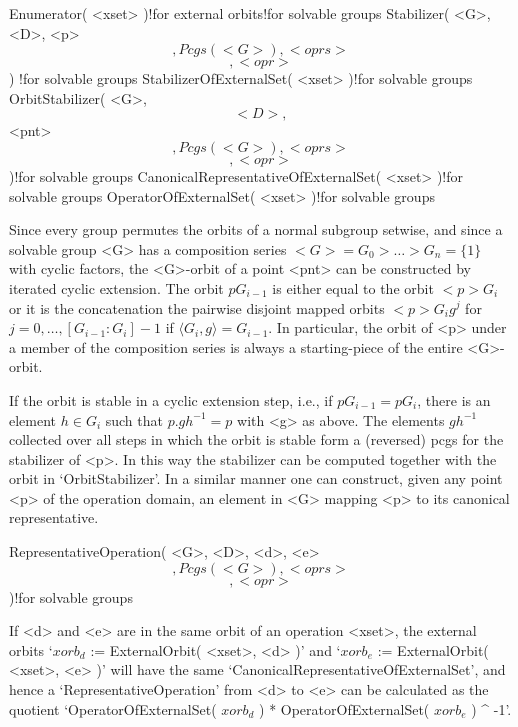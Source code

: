 \>Enumerator( <xset> )!{for external orbits!for solvable groups}
\>Stabilizer( <G>, <D>, <p> \[, {Pcgs( <G> )}, <oprs> \] \[, <opr> \] )%
  !{for solvable groups}
\>StabilizerOfExternalSet( <xset> )!{for solvable groups}
\>OrbitStabilizer( <G>, \[ <D>, \] <pnt> \[, {Pcgs( <G> )}, <oprs> \] %
                   \[, <opr> \] )!{for solvable groups}
\>CanonicalRepresentativeOfExternalSet( <xset> )!{for solvable groups}
\>OperatorOfExternalSet( <xset> )!{for solvable groups}

\danger    Since every group permutes   the  orbits of  a normal subgroup
setwise, and since  a solvable group <G> has  a composition series $<G> =
G_0 > \ldots  > G_n=\{1\}$ with cyclic  factors, the <G>-orbit of a point
<pnt> can  be  constructed by iterated  cyclic   extension. The  orbit $p
G_{i-1}$ is   either  equal  to the   orbit   $<p>  G_i$  or it    is the
concatenation  the pairwise   disjoint  mapped orbits   $<p>  G_ig^j$ for
$j=0,\ldots, [G_{i-1}:G_i] - 1$ if  $\langle G_i, g\rangle = G_{i-1}$. In
particular, the orbit of <p> under a  member of the composition series is
always a starting-piece of the entire <G>-orbit.

If the orbit is stable in a cyclic extension step,  i.e., if $p G_{i-1} =
p G_i$, there is an element $h\in G_i$ such that $p.gh^{-1} = p$ with <g>
as above. The  elements $gh^{-1}$ collected over  all steps  in which the
orbit is stable form a (reversed) pcgs for the stabilizer of <p>. In this
way the    stabilizer  can be   computed together    with   the orbit  in
`OrbitStabilizer'. In a similar manner one can construct, given any point
<p> of   the operation domain,  an   element in  <G> mapping <p>   to its
canonical representative.

\>RepresentativeOperation( <G>, <D>, <d>, <e> \[, {Pcgs( <G> )}, <oprs> %
                           \] \[, <opr> \] )!{for solvable groups}

If <d> and <e> are in the same orbit of an operation <xset>, the external
orbits `$xorb_d$    := ExternalOrbit( <xset>,  <d>   )'  and `$xorb_e$ :=
ExternalOrbit(      <xset>,     <e>    )'     will     have    the   same
`CanonicalRepresentativeOfExternalSet',        and    hence             a
`RepresentativeOperation'  from   <d> to <e>   can be  calculated  as the
quotient `OperatorOfExternalSet(  $xorb_d$  )    * OperatorOfExternalSet(
$xorb_e$ ) ^ -1'.

